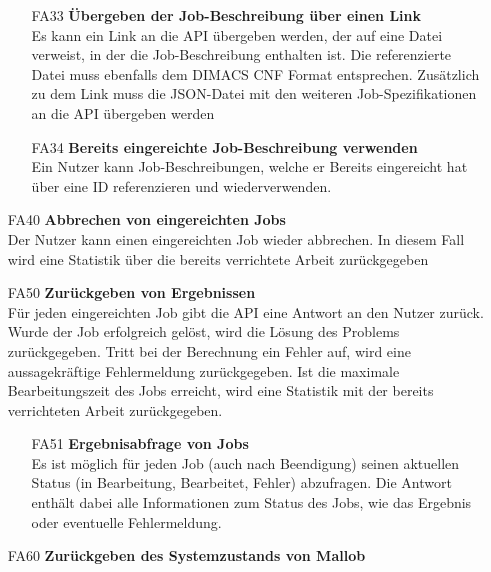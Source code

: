 \begin{itemize}
\begin{itemize}
        \item[FA33] \textbf{Übergeben der Job-Beschreibung über einen Link} \\
        Es kann ein Link an die API übergeben werden, der auf eine Datei verweist, in der die Job-Beschreibung enthalten ist. Die referenzierte Datei muss ebenfalls dem DIMACS CNF Format entsprechen. Zusätzlich zu dem Link muss die JSON-Datei mit den weiteren Job-Spezifikationen an die API übergeben werden
        
        \item[FA34] \textbf{Bereits eingereichte Job-Beschreibung verwenden}\\
        Ein Nutzer kann Job-Beschreibungen, welche er Bereits eingereicht hat über eine ID referenzieren und wiederverwenden.
        
    \end{itemize}
    
    \item[FA40] \textbf{Abbrechen von eingereichten Jobs} \\
    Der Nutzer kann einen eingereichten Job wieder abbrechen. In diesem Fall wird eine Statistik über die bereits verrichtete Arbeit zurückgegeben
    
    \item[FA50] \textbf{Zurückgeben von Ergebnissen} \\
    Für jeden eingereichten Job gibt die API eine Antwort an den Nutzer zurück. Wurde der Job erfolgreich gelöst, wird die Lösung des Problems zurückgegeben. Tritt bei der Berechnung ein Fehler auf, wird eine aussagekräftige Fehlermeldung zurückgegeben. Ist die maximale Bearbeitungszeit des Jobs erreicht, wird eine Statistik mit der bereits verrichteten Arbeit zurückgegeben.
    
    \begin{itemize}
        \item[FA51] \textbf{Ergebnisabfrage von Jobs} \\
        Es ist möglich für jeden Job (auch nach Beendigung) seinen aktuellen Status (in Bearbeitung, Bearbeitet, Fehler) abzufragen. Die Antwort  enthält dabei alle Informationen zum Status des Jobs, wie das Ergebnis oder eventuelle Fehlermeldung.
    \end{itemize}
    

    \item[FA60] \textbf{Zurückgeben des Systemzustands von Mallob} \\
    
    

\end{itemize}




